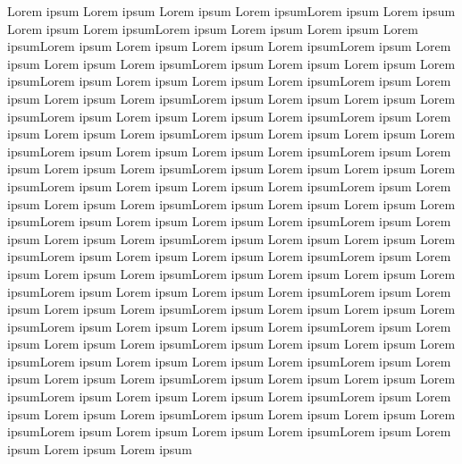 Lorem ipsum Lorem ipsum Lorem ipsum Lorem ipsumLorem ipsum Lorem ipsum Lorem ipsum Lorem ipsumLorem ipsum Lorem ipsum Lorem ipsum Lorem ipsumLorem ipsum Lorem ipsum Lorem ipsum Lorem ipsumLorem ipsum Lorem ipsum Lorem ipsum Lorem ipsumLorem ipsum Lorem ipsum Lorem ipsum Lorem ipsumLorem ipsum Lorem ipsum Lorem ipsum Lorem ipsumLorem ipsum Lorem ipsum Lorem ipsum Lorem ipsumLorem ipsum Lorem ipsum Lorem ipsum Lorem ipsumLorem ipsum Lorem ipsum Lorem ipsum Lorem ipsumLorem ipsum Lorem ipsum Lorem ipsum Lorem ipsumLorem ipsum Lorem ipsum Lorem ipsum Lorem ipsumLorem ipsum Lorem ipsum Lorem ipsum Lorem ipsumLorem ipsum Lorem ipsum Lorem ipsum Lorem ipsumLorem ipsum Lorem ipsum Lorem ipsum Lorem ipsumLorem ipsum Lorem ipsum Lorem ipsum Lorem ipsumLorem ipsum Lorem ipsum Lorem ipsum Lorem ipsumLorem ipsum Lorem ipsum Lorem ipsum Lorem ipsumLorem ipsum Lorem ipsum Lorem ipsum Lorem ipsumLorem ipsum Lorem ipsum Lorem ipsum Lorem ipsumLorem ipsum Lorem ipsum Lorem ipsum Lorem ipsumLorem ipsum Lorem ipsum Lorem ipsum Lorem ipsumLorem ipsum Lorem ipsum Lorem ipsum Lorem ipsumLorem ipsum Lorem ipsum Lorem ipsum Lorem ipsumLorem ipsum Lorem ipsum Lorem ipsum Lorem ipsumLorem ipsum Lorem ipsum Lorem ipsum Lorem ipsumLorem ipsum Lorem ipsum Lorem ipsum Lorem ipsumLorem ipsum Lorem ipsum Lorem ipsum Lorem ipsumLorem ipsum Lorem ipsum Lorem ipsum Lorem ipsumLorem ipsum Lorem ipsum Lorem ipsum Lorem ipsumLorem ipsum Lorem ipsum Lorem ipsum Lorem ipsumLorem ipsum Lorem ipsum Lorem ipsum Lorem ipsumLorem ipsum Lorem ipsum Lorem ipsum Lorem ipsumLorem ipsum Lorem ipsum Lorem ipsum Lorem ipsumLorem ipsum Lorem ipsum Lorem ipsum Lorem ipsumLorem ipsum Lorem ipsum Lorem ipsum Lorem ipsumLorem ipsum Lorem ipsum Lorem ipsum Lorem ipsumLorem ipsum Lorem ipsum Lorem ipsum Lorem ipsum
